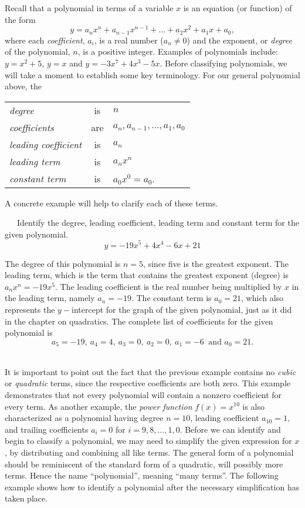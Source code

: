 {}\pp

Recall that a polynomial in terms of a variable $x$ is an equation (or function) of the form
$$y = a_{n}x^{n} + a_{n-1}x^{n-1}+ ... + a_{2}x^2 + a_{1}x + a_{0},$$
where each \textit{coefficient}, $a_{i}$, is a real number ($a_n\neq 0$) and the exponent, or \textit{degree} of the polynomial, $n$, is a positive integer.\pp
Examples of polynomials include: $y = x^2 + 5$, $y=x$ and $y = -3x^7+4x^3-5x$.  Before classifying polynomials, we will take a moment to establish some key terminology. For our general polynomial above, the
\begin{center}
\begin{tabular}{lcl}
\textit{degree} & is & $n$\\
\textit{coefficients} & are & $a_n,a_{n-1},\ldots,a_1,a_0$\\
\textit{leading coefficient} & is & $a_n$\\
\textit{leading term} & is & $a_nx^n$\\
\textit{constant term} & is & $a_0x^0=a_0$.
\end{tabular}
\end{center}

A concrete example will help to clarify each of these terms.

\newpage

\begin{example}~~~Identify the degree, leading coefficient, leading term and constant term for the given polynomial.
$$y = -19x^5+4x^4-6x+21$$

The degree of this polynomial is $n=5$, since five is the greatest exponent.\pp
The leading term, which is the term that contains the greatest exponent (degree) is $a_nx^n=-19x^5$.\pp
The leading coefficient is the real number being multiplied by $x$ in the leading term, namely $a_n=-19$.\pp
The constant term is $a_0=21$, which also represents the $y-$intercept for the graph of the given polynomial, just as it did in the chapter on quadratics.\pp
The complete list of coefficients for the given polynomial is
$$a_5=-19,~ a_4=4,~ a_3=0,~ a_2=0,~ a_1=-6~ \text{~and~} a_0=21.$$
\end{example}
~\\
It is important to point out the fact that the previous example contains no \textit{cubic} or \textit{quadratic} terms, since the respective coefficients are both zero.  This example demonstrates that not every polynomial will contain a nonzero coefficient for every term.  As another example, the \textit{power function} \mbox{$f(x)=x^{10}$} is also characterized as a polynomial having degree $n=10$, leading coefficient $a_{10}=1$, and trailing coefficients $a_i=0$ for $i=9,8,\ldots,1,0$.\pp
Before we can identify and begin to classify a polynomial, we may need to simplify the given expression for $x$, by distributing and combining all like terms.  The general form of a polynomial should be reminiscent of the standard form of a quadratic, will possibly more terms.  Hence the name ``polynomial'', meaning ``many terms''.\pp
The following example shows how to identify a polynomial after the necessary simplification has taken place.

